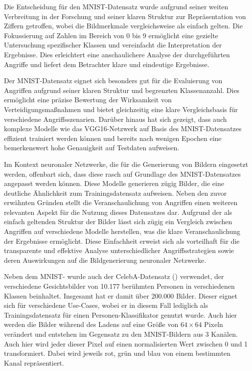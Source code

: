 Die Entscheidung für den MNIST-Datensatz wurde aufgrund seiner weiten Verbreitung in der Forschung und seiner klaren Struktur zur Repräsentation von Ziffern getroffen, wobei die Bildmerkmale vergleichsweise als \glqq einfach\grqq{} gelten. Die Fokussierung auf Zahlen im Bereich von 0 bis 9 ermöglicht eine gezielte Untersuchung spezifischer Klassen und vereinfacht die Interpretation der Ergebnisse. Dies erleichtert eine anschaulichere Analyse der durchgeführten Angriffe und liefert dem Betrachter klare und eindeutige Ergebnisse.

Der MNIST-Datensatz eignet sich besonders gut für die Evaluierung von Angriffen aufgrund seiner klaren Struktur und begrenzten Klassenanzahl. Dies ermöglicht eine präzise Bewertung der Wirksamkeit von Verteidigungsmaßnahmen und bietet gleichzeitig eine klare Vergleichsbasis für verschiedene Angriffsszenarien. Darüber hinaus hat sich gezeigt, dass auch komplexe Modelle wie das VGG16-Netzwerk auf Basis des MNIST-Datensatzes effizient trainiert werden können und bereits nach wenigen Epochen eine bemerkenswert hohe Genauigkeit auf Testdaten aufweisen.

Im Kontext neuronaler Netzwerke, die für die Generierung von Bildern eingesetzt werden, offenbart sich, dass diese rasch auf Grundlage des MNIST-Datensatzes angepasst werden können. Diese Modelle generieren zügig Bilder, die eine deutliche Ähnlichkeit zum Trainingsdatensatz aufweisen. Neben den zuvor erwähnten Gründen stellt die Veranschaulichung von Angriffen einen weiteren relevanten Aspekt für die Nutzung dieses Datensatzes dar. Aufgrund der als \glqq einfach\grqq{} geltenden Struktur der Bilder lässt sich zügig ein Vergleich zwischen Angriffen auf verschiedene Modelle herstellen, was die klare Veranschaulichung der Ergebnisse ermöglicht. Diese \glqq Einfachheit\grqq{} erweist sich als vorteilhaft für die transparente und effektive Analyse unterschiedlicher Angriffsstrategien sowie deren Auswirkungen auf die Bildgenerierung neuronaler Netzwerke.

Neben dem MNIST- wurde auch der CelebA-Datensatz (\cite{noauthor_celeba_nodate}) verwendet, der verschiedene Gesichtsbilder von 10.177 berühmten Personen in verschiedenen Klassen beinhaltet. Insgesamt hat er damit über 200.000 Bilder. Dieser eignet sich für verschiedene Use-Cases, wobei er in diesem Fall lediglich als Trainingsdatensatz für einen \glqq Personen\grqq-Klassifikator genutzt wurde. Auch hier werden die Bilder während des Ladens auf eine Größe von $64 \times 64$ Pixeln verändert und entstehen im Gegensatz zu den MNIST-Bildern aus 3 Kanälen. Auch hier wird jeder dieser Pixel auf einen normalisierten Wert zwischen 0 und 1 transformiert. Dabei wird jeweils rot, grün und blau von einem bestimmten Kanal repräsentiert. 

